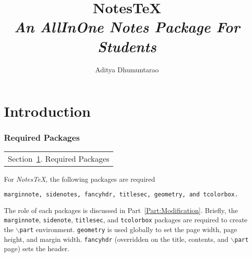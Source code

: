 \documentclass[10pt]{article}
\begin{document}
\title{{NotesTeX}\\{\normalsize{\itshape{} An All\text{-}In\text{-}One Notes Package For Students}}}
\author{Aditya Dhumuntarao}
\maketitle{}
\newpage{}
\pagestyle{fancynotes}
\part{Introduction}

\section{Required Packages}\label{sec:reqpackages}
\begin{margintable}\vspace{.8in}\footnotesize{}
	\begin{tabularx}{\marginparwidth}{|X}
		Section~\ref{sec:reqpackages}. Required Packages \\
	\end{tabularx}
\end{margintable}
For \textit{NotesTeX,} the following packages are required
\begin{center}
	\texttt{marginnote, sidenotes, fancyhdr, titlesec, geometry, and tcolorbox.}
\end{center}
The role of each packages is discussed in Part~\ref{Part:Modification}. Briefly, the \texttt{marginnote}, \texttt{sidenote}, \texttt{titlesec}, and \texttt{tcolorbox} packages are required to create the \texttt{\( \backslash \)part} environment. \texttt{geometry} is used globally to set the page width, page height, and margin width. \texttt{fancyhdr} (overridden on the title, contents, and \texttt{\( \backslash \)part} page) sets the header.
\end{document}
